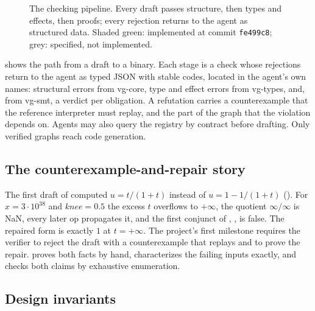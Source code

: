 \begin{figure}[t]
\caption{The checking pipeline. Every draft passes structure, then types and effects, then
proofs; every rejection returns to the agent as structured data. Shaded green: implemented at
commit \texttt{fe499c8}; grey: specified, not implemented.}
\label{fig:pipeline}
\end{figure}

 shows the path from a draft to a binary. Each stage is a check whose
rejections return to the agent as typed JSON with stable codes, located in the agent's own
names: structural errors from vg-core, type and effect errors from vg-types, and, from vg-smt,
a verdict per obligation. A refutation carries a counterexample that the reference
interpreter must replay, and the part of the graph that the violation depends on. Agents may
also query the registry by contract before drafting. Only verified graphs reach code
generation.

\subsection{The counterexample-and-repair story}

The first draft of  computed $u = t/(1+t)$ instead of $u = 1-1/(1+t)$
(). For $x = 3\cdot 10^{38}$ and $\mathit{knee} = 0.5$ the
excess $t$ overflows to $+\infty$, the quotient $\infty/\infty$ is NaN, every later op
propagates it, and the first conjunct of , , is false. The repaired
form is exactly $1$ at $t = +\infty$. The project's first milestone requires the verifier to
reject the draft with a counterexample that replays and to prove the repair.
 proves both facts by hand, characterizes the failing inputs exactly, and
checks both claims by exhaustive enumeration.

\subsection{Design invariants}\label{sec:invariants}

